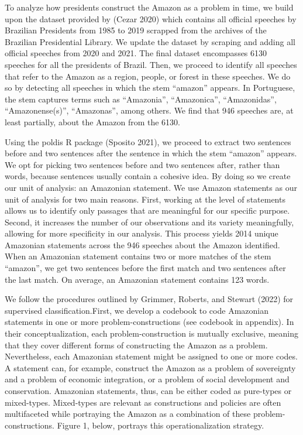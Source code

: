\documentclass[
]{article}
\begin{document}
To analyze how presidents construct the Amazon as a problem in time, we
build upon the dataset provided by (Cezar 2020) which contains all
official speeches by Brazilian Presidents from 1985 to 2019 scrapped
from the archives of the Brazilian Presidential Library. We update the
dataset by scraping and adding all official speeches from 2020 and 2021.
The final dataset encompasses 6130 speeches for all the presidents of
Brazil. Then, we proceed to identify all speeches that refer to the
Amazon as a region, people, or forest in these speeches. We do so by
detecting all speeches in which the stem ``amazon'' appears. In
Portuguese, the stem captures terms such as ``Amazonia'', ``Amazonica'',
``Amazonidas'', ``Amazonense(s)'', ``Amazonas'', among others. We find
that 946 speeches are, at least partially, about the Amazon from the
6130.

Using the poldis R package (Sposito 2021), we proceed to extract two
sentences before and two sentences after the sentence in which the stem
``amazon'' appears. We opt for picking two sentences before and two
sentences after, rather than words, because sentences usually contain a
cohesive idea. By doing so we create our unit of analysis: an Amazonian
statement. We use Amazon statements as our unit of analysis for two main
reasons. First, working at the level of statements allows us to identify
only passages that are meaningful for our specific purpose. Second, it
increases the number of our observations and its variety meaningfully,
allowing for more specificity in our analysis. This process yields 2014
unique Amazonian statements across the 946 speeches about the Amazon
identified. When an Amazonian statement contains two or more matches of
the stem ``amazon'', we get two sentences before the first match and two
sentences after the last match. On average, an Amazonian statement
contains 123 words.

We follow the procedures outlined by Grimmer, Roberts, and Stewart
(2022) for supervised classification.First, we develop a codebook to
code Amazonian statements in one or more problem-constructions (see
codebook in appendix). In their conceptualization, each
problem-construction is mutually exclusive, meaning that they cover
different forms of constructing the Amazon as a problem. Nevertheless,
each Amazonian statement might be assigned to one or more codes. A
statement can, for example, construct the Amazon as a problem of
sovereignty and a problem of economic integration, or a problem of
social development and conservation. Amazonian statements, thus, can be
either coded as pure-types or mixed-types. Mixed-types are relevant as
constructions and policies are often multifaceted while portraying the
Amazon as a combination of these problem-constructions. Figure 1, below,
portrays this operationalization strategy.
\end{document}
